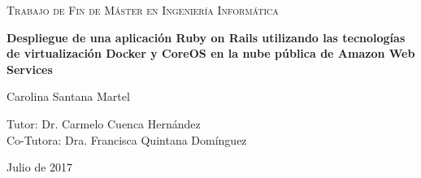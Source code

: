 \begin{titlepage}
	\centering
	\begin{figure}[H]
        \centering
	\end{figure}\par\vspace{1cm}
	{\scshape\Large Trabajo de Fin de Máster en Ingeniería Informática\par}
	\vspace{1.5cm}
	{\huge\bfseries Despliegue de una aplicación Ruby on Rails utilizando las tecnologías de virtualización Docker y CoreOS en la nube pública de Amazon Web Services\par}
	\vspace{2.5cm}
	{\Large Carolina Santana Martel\par}
	\vspace{1.5cm}
	\large Tutor: Dr. Carmelo Cuenca Hernández \\
        \vspace{0.5cm}
	\large Co-Tutora: Dra. Francisca Quintana Domínguez \\ 
        \vspace{1.5cm}
	{\large Julio de 2017\par}
\end{titlepage}
